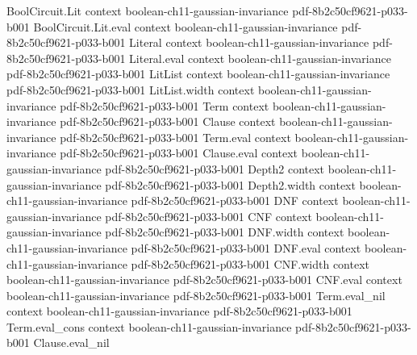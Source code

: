 \begin{theorem}
\leanok
{}
\proofstep
  {BoolCircuit.Lit}
  {context}
  {boolean-ch11-gaussian-invariance}
  {pdf-8b2c50cf9621-p033-b001}
\proofstep
  {BoolCircuit.Lit.eval}
  {context}
  {boolean-ch11-gaussian-invariance}
  {pdf-8b2c50cf9621-p033-b001}
\proofstep
  {Literal}
  {context}
  {boolean-ch11-gaussian-invariance}
  {pdf-8b2c50cf9621-p033-b001}
\proofstep
  {Literal.eval}
  {context}
  {boolean-ch11-gaussian-invariance}
  {pdf-8b2c50cf9621-p033-b001}
\proofstep
  {LitList}
  {context}
  {boolean-ch11-gaussian-invariance}
  {pdf-8b2c50cf9621-p033-b001}
\proofstep
  {LitList.width}
  {context}
  {boolean-ch11-gaussian-invariance}
  {pdf-8b2c50cf9621-p033-b001}
\proofstep
  {Term}
  {context}
  {boolean-ch11-gaussian-invariance}
  {pdf-8b2c50cf9621-p033-b001}
\proofstep
  {Clause}
  {context}
  {boolean-ch11-gaussian-invariance}
  {pdf-8b2c50cf9621-p033-b001}
\proofstep
  {Term.eval}
  {context}
  {boolean-ch11-gaussian-invariance}
  {pdf-8b2c50cf9621-p033-b001}
\proofstep
  {Clause.eval}
  {context}
  {boolean-ch11-gaussian-invariance}
  {pdf-8b2c50cf9621-p033-b001}
\proofstep
  {Depth2}
  {context}
  {boolean-ch11-gaussian-invariance}
  {pdf-8b2c50cf9621-p033-b001}
\proofstep
  {Depth2.width}
  {context}
  {boolean-ch11-gaussian-invariance}
  {pdf-8b2c50cf9621-p033-b001}
\proofstep
  {DNF}
  {context}
  {boolean-ch11-gaussian-invariance}
  {pdf-8b2c50cf9621-p033-b001}
\proofstep
  {CNF}
  {context}
  {boolean-ch11-gaussian-invariance}
  {pdf-8b2c50cf9621-p033-b001}
\proofstep
  {DNF.width}
  {context}
  {boolean-ch11-gaussian-invariance}
  {pdf-8b2c50cf9621-p033-b001}
\proofstep
  {DNF.eval}
  {context}
  {boolean-ch11-gaussian-invariance}
  {pdf-8b2c50cf9621-p033-b001}
\proofstep
  {CNF.width}
  {context}
  {boolean-ch11-gaussian-invariance}
  {pdf-8b2c50cf9621-p033-b001}
\proofstep
  {CNF.eval}
  {context}
  {boolean-ch11-gaussian-invariance}
  {pdf-8b2c50cf9621-p033-b001}
\proofstep
  {Term.eval_nil}
  {context}
  {boolean-ch11-gaussian-invariance}
  {pdf-8b2c50cf9621-p033-b001}
\proofstep
  {Term.eval_cons}
  {context}
  {boolean-ch11-gaussian-invariance}
  {pdf-8b2c50cf9621-p033-b001}
\proofstep
  {Clause.eval_nil}

\end{theorem}
